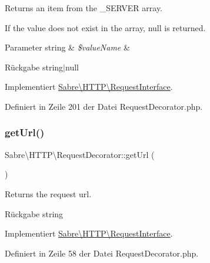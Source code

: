 Returns an item from the \+\_\+\+S\+E\+R\+V\+ER array.

If the value does not exist in the array, null is returned.


\begin{DoxyParams}[1]{Parameter}
string & {\em \$value\+Name} & \\
\hline
\end{DoxyParams}
\begin{DoxyReturn}{Rückgabe}
string$\vert$null 
\end{DoxyReturn}


Implementiert \mbox{\hyperlink{interface_sabre_1_1_h_t_t_p_1_1_request_interface_a96c2cbeb9c1e9c3431c0f98bc7c7d93c}{Sabre\textbackslash{}\+H\+T\+T\+P\textbackslash{}\+Request\+Interface}}.



Definiert in Zeile 201 der Datei Request\+Decorator.\+php.

\mbox{\label{class_sabre_1_1_h_t_t_p_1_1_request_decorator_a7d8a661f5bc1d045b4d1d9d315ff6aae}} 
\subsubsection{\texorpdfstring{get\+Url()}{getUrl()}}
{\footnotesize\ttfamily Sabre\textbackslash{}\+H\+T\+T\+P\textbackslash{}\+Request\+Decorator\+::get\+Url (\begin{DoxyParamCaption}{ }\end{DoxyParamCaption})}

Returns the request url.

\begin{DoxyReturn}{Rückgabe}
string 
\end{DoxyReturn}


Implementiert \mbox{\hyperlink{interface_sabre_1_1_h_t_t_p_1_1_request_interface_a0b28a29e4efe43665cc2f23fbac62570}{Sabre\textbackslash{}\+H\+T\+T\+P\textbackslash{}\+Request\+Interface}}.



Definiert in Zeile 58 der Datei Request\+Decorator.\+php.

\mbox{\label{class_sabre_1_1_h_t_t_p_1_1_request_decorator_ad3a68a47dd02e6e338ce03dac1dc409a}} 
